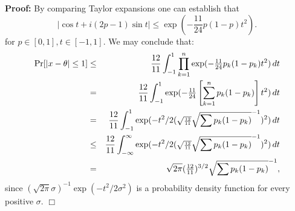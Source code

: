 \documentclass[12pt]{article}
\newenvironment{proof}{\noindent \textbf{Proof:}}{$\Box$}
\newcommand{\infint}{\int_{-\infty}^\infty}
\newcommand{\intunit}{\int_{-1}^1}
\begin{document}
\begin{proof}
\noindent By comparing Taylor expansions one can establish that
$$
|\cos t + i(2p-1) \sin t| \leq \exp(-{\frac {11}{24}}p(1-p)t^2).
$$
for $p \in [0,1], t\in[-1,1].$
We may conclude that:
\begin{eqnarray*}
\Pr[|x-\theta| \leq 1] & \leq & \twel \intunit \prod_{k=1}^n \exp(-{\textstyle 
\frac{11}{24}}p_k(1-p_k)t^2) \,dt \\
& = & \twel \intunit \exp(-{\textstyle \frac{11}{24}}\left[\sum_{k=1}^n p_k(1-p_k)\right]t^2) \,dt 
\\
& = & \twel \intunit \exp(-t^2/2({\scriptstyle \sqrt{\twel}}\sqrt{\sum p_k(1-p_k)}^{-1})^2)\,dt \\
& \leq & \twel \infint \exp(-t^2/2({\scriptstyle \sqrt{\twel}}\sqrt{\sum p_k(1-p_k)}^{-1})^2)\,dt 
\\
& = & \sqrt{2\pi}({\textstyle \twel})^{3/2} \sqrt{\sum p_k(1-p_k)}^{-1},
\end{eqnarray*}
since $(\sqrt{2\pi} \sigma)^{-1} \exp(-t^2/2\sigma^2)$ is a probability density function for every 
positive $\sigma$.
\end{proof}
\end{document}
